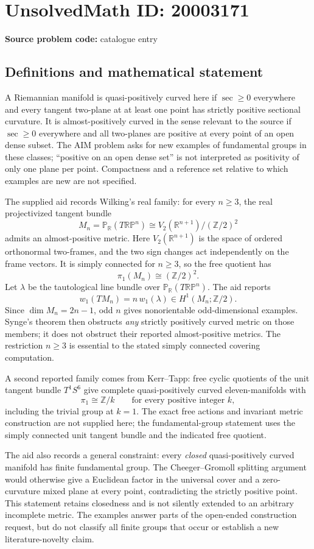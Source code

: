 \documentclass[11pt]{article}
\newcommand{\Z}{\mathbb{Z}}
\newcommand{\R}{\mathbb{R}}
\newcommand{\PP}{\mathbb{P}}
\begin{document}
\section*{UnsolvedMath ID: 20003171}
\textbf{Source problem code:} catalogue entry
\subsection{Definitions and mathematical statement}
A Riemannian manifold is quasi-positively curved here if \(\sec\ge0\) everywhere and every tangent two-plane at at least one point has strictly positive sectional curvature. It is almost-positively curved in the sense relevant to the source if \(\sec\ge0\) everywhere and all two-planes are positive at every point of an open dense subset. The AIM problem asks for new examples of fundamental groups in these classes; ``positive on an open dense set'' is not interpreted as positivity of only one plane per point. Compactness and a reference set relative to which examples are new are not specified.

The supplied aid records Wilking's real family: for every \(n\ge3\), the real projectivized tangent bundle
\[
M_n=\PP_\R(T\R\PP^n)
\cong V_2(\R^{n+1})/(\Z/2)^2
\]
admits an almost-positive metric. Here \(V_2(\R^{n+1})\) is the space of ordered orthonormal two-frames, and the two sign changes act independently on the frame vectors. It is simply connected for \(n\ge3\), so the free quotient has
\[
\pi_1(M_n)\cong(\Z/2)^2.
\]
Let \(\lambda\) be the tautological line bundle over \(\PP_\R(T\R\PP^n)\). The aid reports
\[
w_1(TM_n)=n\,w_1(\lambda)\in H^1(M_n;\Z/2).
\]
Since \(\dim M_n=2n-1\), odd \(n\) gives nonorientable odd-dimensional examples. Synge's theorem then obstructs \emph{any} strictly positively curved metric on those members; it does not obstruct their reported almost-positive metrics. The restriction \(n\ge3\) is essential to the stated simply connected covering computation.

A second reported family comes from Kerr--Tapp: free cyclic quotients of the unit tangent bundle \(T^1S^6\) give complete quasi-positively curved eleven-manifolds with
\[
\pi_1\cong\Z/k\qquad\text{for every positive integer }k,
\]
including the trivial group at \(k=1\). The exact free actions and invariant metric construction are not supplied here; the fundamental-group statement uses the simply connected unit tangent bundle and the indicated free quotient.

The aid also records a general constraint: every \emph{closed} quasi-positively curved manifold has finite fundamental group. The Cheeger--Gromoll splitting argument would otherwise give a Euclidean factor in the universal cover and a zero-curvature mixed plane at every point, contradicting the strictly positive point. This statement retains closedness and is not silently extended to an arbitrary incomplete metric. The examples answer parts of the open-ended construction request, but do not classify all finite groups that occur or establish a new literature-novelty claim.
\end{document}
